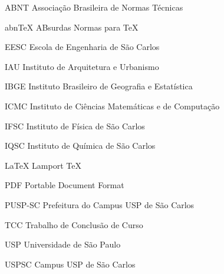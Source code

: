 \begin{siglas}
    \item[ABNT] Associação Brasileira de Normas T\'ecnicas
    \item[abnTeX] ABsurdas Normas para TeX
	\item[EESC] Escola de Engenharia de São Carlos
	\item[IAU] Instituto de Arquitetura e Urbanismo
	\item[IBGE] Instituto Brasileiro de Geografia e Estatística
	\item[ICMC] Instituto de Ci\^encias Matem\'aticas e de Computação
	\item[IFSC] Instituto de Física de São Carlos
	\item[IQSC] Instituto de Química de São Carlos
	\item[LaTeX] Lamport TeX
	\item[PDF] Portable Document Format
	\item[PUSP-SC] Prefeitura do Campus USP de São Carlos
	\item[TCC] Trabalho de Conclusão de Curso
	\item[USP] Universidade de São Paulo
	\item[USPSC] Campus USP de São Carlos
\end{siglas}
